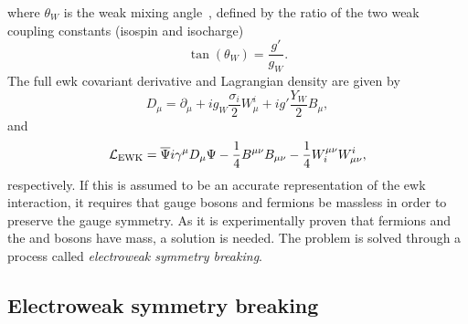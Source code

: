 where $\theta_{W}$ is the weak mixing angle~\cite{Th:SM1}, defined by the ratio of the two weak coupling constants (isospin and isocharge) 
\begin{equation}
	\tan(\theta_{W}) = \frac{g'}{g_{W}}.	
\end{equation}
The full \acrshort{ewk} covariant derivative and Lagrangian density are given by
\begin{equation}
D_{\mu} = \partial_{\mu}+ig_{W}\frac{\sigma_{i}}{2}W_{\mu}^{i}+ig'\frac{Y_{W}}{2}B_{\mu},
\end{equation}
and
\begin{equation}
\mathcal{L}_{\mathrm{EWK}}=\overline{\Psi}i\gamma^{\mu}D_{\mu}\Psi - \frac{1}{4}B^{\mu\nu}B_{\mu\nu} - \frac{1}{4}W^{\mu\nu}_{i}W_{\mu\nu}^{i},
\end{equation}
respectively.
If this is assumed to be an accurate representation of the \acrshort{ewk} interaction, it requires that gauge bosons and fermions be massless in order to preserve the gauge symmetry.
As it is experimentally proven that fermions and the \Wboson{} and \Zboson{} bosons have mass, a solution is needed.
The problem is solved through a process called \textit{electroweak symmetry breaking}.

\subsection{Electroweak symmetry breaking} %
\label{sub:electroweak_symmetry_breaking}

